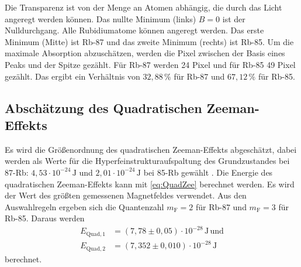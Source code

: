 Die Transparenz ist von der Menge an Atomen abhängig, die durch das Licht angeregt werden können.
Das nullte Minimum (links) $B = 0$ ist der Nulldurchgang.
Alle Rubidiumatome können angeregt werden.
Das erste Minimum (Mitte) ist Rb-87 und das zweite Minimum (rechts) ist Rb-85.
Um die maximale Absorption abzuschätzen, werden die Pixel zwischen der Basis eines Peaks und der Spitze gezählt.
Für Rb-87 werden 24 Pixel und für Rb-85 49 Pixel gezählt.
Das ergibt ein Verhältnis von $32,88\, \%$ für Rb-87 und $67,12 \, \% $ für Rb-85.

\subsection{Abschätzung des Quadratischen Zeeman-Effekts}

Es wird die Größenordnung des quadratischen Zeeman-Effekts abgeschätzt, 
dabei werden als Werte für die Hyperfeinstrukturaufspaltung des Grundzustandes bei 87-Rb: $4,53 \cdot 10^{-24} \, \unit{\joule} $ und $2,01 \cdot 10^{-24} \, \unit{\joule}$ bei  85-Rb  gewählt \cite{v21}.
Die Energie des quadratischen Zeeman-Effekts kann mit \eqref{eq:QuadZee} berechnet werden.
Es wird der Wert des größten gemessenen Magnetfeldes verwendet. Aus den Auswahlregeln ergeben sich die Quantenzahl $m_\text{F} = 2$ für Rb-87 und $m_\text{F} = 3$ für Rb-85.
Daraus werden 
\begin{align*}
    E_{\text{Quad},1} &= \left(7,78  \pm 0,05 \right)   \cdot 10^{-28} \, \unit{\joule} \, \text{und} \\
    E_{\text{Quad},2} &= \left(7,352 \pm 0,010 \right) \cdot 10^{-28} \, \unit{\joule}
\end{align*}
berechnet.